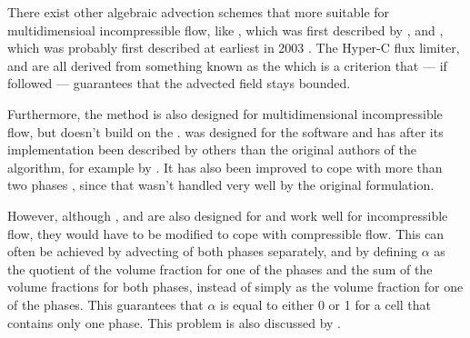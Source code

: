 There exist other algebraic advection schemes that more suitable for multidimensioal incompressible flow, like \CICSAM, which was first described by \citet{Ubbink1999}, and \STACS, which was probably first described at earliest in 2003 \citep{Darwish}. The Hyper-C flux limiter, \CICSAM and \STACS are all derived from something known as the \CBC which is a criterion that --- if followed --- guarantees that the advected field stays bounded.

Furthermore, the \MULES method is also designed for multidimensional incompressible flow, but doesn't build on the \CBC. \MULES was designed for the  software  and has after its implementation been described by others than the original authors of the algorithm, for example by \citet{Berberovi2009}. It has also been improved to cope with more than two phases \citep{Kissling2010}, since that wasn't handled very well by the original formulation.


However, although \CICSAM, \STACS and \MULES are also designed for and work well for incompressible flow, they would have to be modified to cope with compressible flow. This can often be achieved by advecting  of both phases separately, and by defining $\alpha$ as the quotient of the volume fraction for one of the phases and the sum of the volume fractions for both phases, instead of simply as the volume fraction for one of the phases. This guarantees that $\alpha$ is equal to either 0 or 1 for a cell that contains only one phase. This problem is also discussed by \citet{Heyns2011}.
